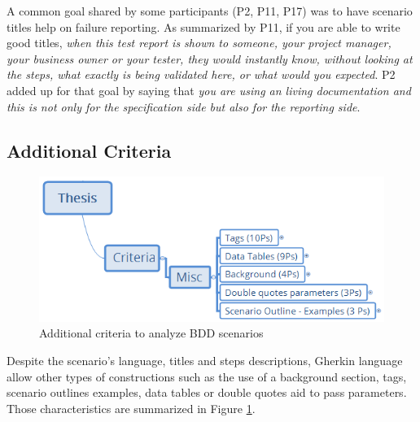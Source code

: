 A common goal shared by some participants (P2, P11, P17) was to have scenario titles help on failure reporting. As summarized by P11, if you are able to write good titles, \textit{when this test report is shown to someone, your project manager, your business owner or your tester, they would instantly know, without looking at the steps, what exactly is being validated here, or what would you expected}. P2 added up for that goal by saying that \textit{you are using an living documentation and this is not only for the specification side but also for the reporting side}.


\subsection{Additional Criteria}

\begin{figure}[t]
	\centering
	\includegraphics[scale=0.8]{images/misc_criteria}
	\caption[\hspace{2mm}Additional criteria to analyze BDD scenarios]{Additional criteria to analyze BDD scenarios}
	\label{fig:misc_criteria}
\end{figure}

Despite the scenario's language, titles and steps descriptions, Gherkin language allow other types of constructions such as the use of a background section, tags, scenario outlines examples, data tables or double quotes aid to pass parameters. Those characteristics are summarized in Figure \ref{fig:misc_criteria}.

